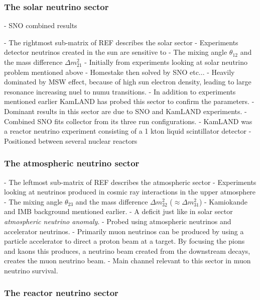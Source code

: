 \subsubsection*{The solar neutrino sector} %

- SNO combined results~\cite{maneira2011}

- The rightmost sub-matrix of REF describes the solar sector
- Experiments detector neutrinos created in the sun are sensitive to
- The mixing angle $\theta_{12}$ and the mass difference $\Delta m^{2}_{21}$
- Initially from experiments looking at solar neutrino problem mentioned above
- Homestake then solved by SNO etc...
- Heavily dominated by MSW effect, because of high sun electron density, leading to large
resonance increasing nuel to numu transitions.
- In addition to experiments mentioned earlier KamLAND has probed this sector to confirm the
parameters.
- Dominant results in this sector are due to SNO and KamLAND experiments.
- Combined SNO fits collector from its three run configurations.
- KamLAND was a reactor neutrino experiment consisting of a 1 kton liquid scintillator detector
- Positioned between several nuclear reactors

\subsubsection*{The atmospheric neutrino sector} %
- The leftmost sub-matrix of REF describes the atmospheric sector
- Experiments looking at neutrinos produced in cosmic ray interactions in the upper atmosphere
- The mixing angle $\theta_{23}$ and the mass difference $\Delta m^{2}_{32}$
($\approx\Delta m^{2}_{31}$)
- Kamiokande and IMB background mentioned earlier.
- A deficit just like in solar sector \emph{atmospheric neutrino anomaly}.
- Probed using atmospheric neutrinos and accelerator neutrinos.
- Primarily muon neutrinos can be produced by using a particle accelerator to direct a proton beam
at a target. By focusing the pions and kaons this produces, a neutrino beam created from the
downstream decays, creates the muon neutrino beam.
- Main channel relevant to this sector in muon neutrino survival.

\subsubsection*{The reactor neutrino sector} %

